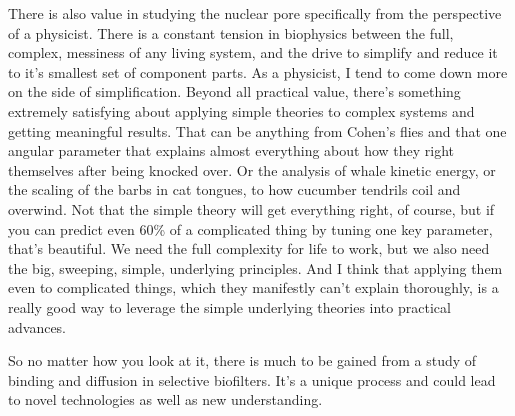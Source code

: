 There is also value in studying the nuclear pore specifically from the perspective of a physicist.  There is a constant tension in biophysics between the full, complex, messiness of any living system, and the drive to simplify and reduce it to it's smallest set of component parts.  As a physicist, I tend to come down more on the side of simplification.  Beyond all practical value, there's something extremely satisfying about applying simple theories to complex systems and getting meaningful results.  That can be anything from Cohen's flies and that one angular parameter that explains almost everything about how they right themselves after being knocked over.  Or the analysis of whale kinetic energy, or the scaling of the barbs in cat tongues, to how cucumber tendrils coil and overwind.  Not that the simple theory will get everything right, of course, but if you can predict even 60\% of a complicated thing by tuning one key parameter, that's beautiful.  We need the full complexity for life to work, but we also need the big, sweeping, simple, underlying principles.  And I think that applying them even to complicated things, which they manifestly can't explain thoroughly, is a really good way to leverage the simple underlying theories into practical advances.

So no matter how you look at it, there is much to be gained from a study of binding and diffusion in selective biofilters.  It's a unique process and could lead to novel technologies as well as new understanding.



